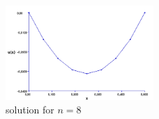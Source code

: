 \documentclass[10pt,a4paper]{report}
\begin{document}
\begin{figure}[H]
  \caption{solution for $n= 8$}
  \centering
    \includegraphics[width=0.5\textwidth]{n8.png}
\end{figure}
\end{document}
